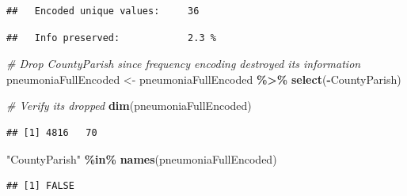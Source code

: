 \documentclass[
]{article}
\newenvironment{Shaded}{\begin{snugshade}}{\end{snugshade}}
\newcommand{\CommentTok}[1]{\textcolor[rgb]{0.56,0.35,0.01}{\textit{#1}}}
\newcommand{\DecValTok}[1]{\textcolor[rgb]{0.00,0.00,0.81}{#1}}
\newcommand{\FunctionTok}[1]{\textcolor[rgb]{0.13,0.29,0.53}{\textbf{#1}}}
\newcommand{\NormalTok}[1]{#1}
\newcommand{\OtherTok}[1]{\textcolor[rgb]{0.56,0.35,0.01}{#1}}
\newcommand{\SpecialCharTok}[1]{\textcolor[rgb]{0.81,0.36,0.00}{\textbf{#1}}}
\newcommand{\StringTok}[1]{\textcolor[rgb]{0.31,0.60,0.02}{#1}}
\begin{document}
\begin{verbatim}
##   Encoded unique values:     36
\end{verbatim}

\begin{Shaded}
\end{Shaded}

\begin{verbatim}
##   Info preserved:            2.3 %
\end{verbatim}

\begin{Shaded}
\begin{Highlighting}[]
\CommentTok{\# Drop CountyParish since frequency encoding destroyed its information}
\NormalTok{pneumoniaFullEncoded }\OtherTok{\textless{}{-}}\NormalTok{ pneumoniaFullEncoded }\SpecialCharTok{\%\textgreater{}\%}
    \FunctionTok{select}\NormalTok{(}\SpecialCharTok{{-}}\NormalTok{CountyParish)}

\CommentTok{\# Verify it\textquotesingle{}s dropped}
\FunctionTok{dim}\NormalTok{(pneumoniaFullEncoded)}
\end{Highlighting}
\end{Shaded}

\begin{verbatim}
## [1] 4816   70
\end{verbatim}

\begin{Shaded}
\begin{Highlighting}[]
\StringTok{"CountyParish"} \SpecialCharTok{\%in\%} \FunctionTok{names}\NormalTok{(pneumoniaFullEncoded)}
\end{Highlighting}
\end{Shaded}

\begin{verbatim}
## [1] FALSE
\end{verbatim}
\end{document}
